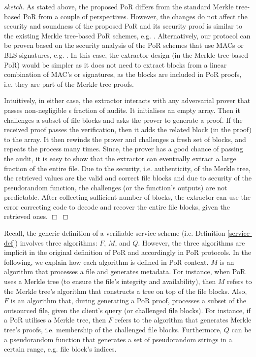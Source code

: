  \begin{proof}[sketch]
 As stated above, the proposed PoR differs from the standard Merkle tree-based PoR from a couple of perspectives. However, the changes do not affect the security and soundness of the proposed PoR and its security proof is similar to the existing Merkle tree-based PoR schemes, e.g. \cite{DBLP:conf/ccs/HaleviHPS11,MillerPermacoin,DBLP:journals/iacr/JuelsK07}. Alternatively, our protocol can be proven based on the security analysis of the PoR schemes that use  MACs or BLS signatures, e.g. \cite{DBLP:conf/asiacrypt/ShachamW08}. In this case, the extractor design (in the Merkle tree-based PoR)  would be simpler as it does not need to extract blocks from a linear combination of MAC's or signatures, as the  blocks are included in PoR proofs, i.e. they are part of the Merkle tree proofs. 
 
 Intuitively, in either case, the extractor interacts with any adversarial prover that passes non-negligible $\epsilon$ fraction of audits. It initialises an empty array. Then it  challenges a subset of file blocks and asks the prover to generate a proof.  If the received proof passes the verification, then it adds the related block (in the proof) to the array. It then rewinds the prover and challenges a fresh set of blocks, and repeats the process  many times. Since, the prover has a good chance of passing the audit, it is easy to show that the extractor can eventually extract a large fraction of the entire file. Due to the security, i.e. authenticity, of the Merkle tree, the retrieved values are the valid and correct file blocks and due to security of the pseudorandom function, the challenges (or the function's outputs) are not predictable. After collecting sufficient number of blocks, the extractor can use the error correcting code to decode and recover the entire file blocks, given the retrieved ones. 
 \hfill\(\Box\)\end{proof}
   
   \begin{remark}
   Recall,  the generic definition of a verifiable service scheme (i.e. Definition \ref{service-def}) involves three algorithms: $F$, $M$, and $Q$. However, the three algorithms are implicit in the original definition of  PoR and accordingly in  PoR protocols. In the following, we explain how each algorithm is defined in PoR context.  $M$ is an algorithm that processes a file and generates metadata. For instance, when PoR uses a Merkle tree (to ensure the file's integrity and availability), then $M$ refers to the Merkle tree's algorithm that constructs a tree on top of the file blocks. Also,  $F$ is an algorithm that, during generating a PoR proof, processes a subset of the outsourced file, given the client's query (or challenged file blocks). For instance, if a PoR  utilises a Merkle tree, then $F$ refers to the algorithm that generates Merkle tree's proofs, i.e.  membership of the challenged file blocks. Furthermore, $Q$ can be  a pseudorandom function that generates a set of pseudorandom strings in a certain range, e.g. file block's indices.   
   \end{remark}



%














